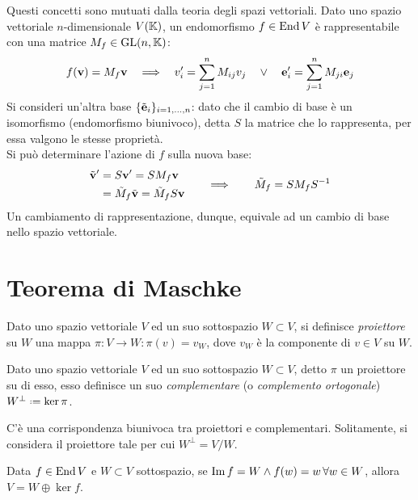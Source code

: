 Questi concetti sono mutuati dalla teoria degli spazi vettoriali. Dato uno spazio vettoriale $ n $-dimensionale $ V(\mathbb{K}) $, un endomorfismo $ f \in \operatorname{End}{V} $ è rappresentabile con una matrice $ M_f \in \mathrm{GL}(n,\mathbb{K}) $:
\begin{equation*}
	f(\mathbf{v}) = M_f \mathbf{v} \quad \Longrightarrow \quad v'_i = \sum_{j = 1}^{n} M_{ij} v_j \quad \lor \quad \mathbf{e}'_i = \sum_{j = 1}^{n} M_{ji} \mathbf{e}_j
\end{equation*}
Si consideri un'altra base $ \{\tilde{\mathbf{e}}_i\}_{i = 1, \dots, n} $: dato che il cambio di base è un isomorfismo (endomorfismo biunivoco), detta $ S $ la matrice che lo rappresenta, per essa valgono le stesse proprietà.\\
Si può determinare l'azione di $ f $ sulla nuova base:
\begin{equation*}
	\begin{split}
		\tilde{\mathbf{v}}'
		&= S \mathbf{v}' = S M_f \mathbf{v}\\
		&= \tilde{M}_f \tilde{\mathbf{v}} = \tilde{M}_f S \mathbf{v}
	\end{split}
	\qquad \Longrightarrow \qquad
	\tilde{M}_f = S M_f S^{-1}
\end{equation*}
Un cambiamento di rappresentazione, dunque, equivale ad un cambio di base nello spazio vettoriale.

\section{Teorema di Maschke}

\begin{definition}
	Dato uno spazio vettoriale $ V $ ed un suo sottospazio $ W \subset V $, si definisce \textit{proiettore} su $ W $ una mappa $ \pi : V \rightarrow W : \pi(v) = v_W $, dove $ v_W $ è la componente di $ v \in V $ su $ W $.
\end{definition}

\begin{definition}
	Dato uno spazio vettoriale $ V $ ed un suo sottospazio $ W \subset V $, detto $ \pi $ un proiettore su di esso, esso definisce un suo \textit{complementare} (o \textit{complemento ortogonale}) $ W^{\perp} \defeq \ker{\pi} $.
\end{definition}

C'è una corrispondenza biunivoca tra proiettori e complementari. Solitamente, si considera il proiettore tale per cui $ W^{\perp} = V / W $.

\begin{proposition}
	Data $ f \in \operatorname{End}{V}  $ e $ W \subset V $ sottospazio, se $ \operatorname{Im}{f} = W \land f(w) = w \,\forall w \in W $, allora $ V = W \oplus \ker{f} $.
\end{proposition}

